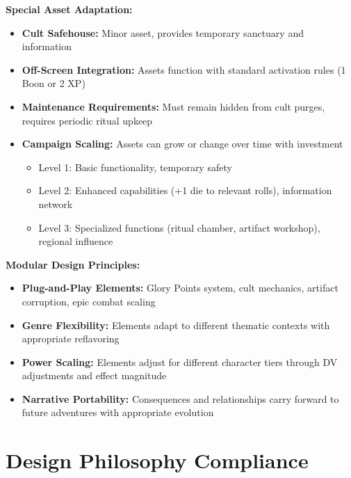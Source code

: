 \documentclass[11pt]{article}
\begin{document}
\begin{itemize}
\begin{itemize}
\begin{itemize}
\textbf{Special Asset Adaptation:}
\begin{itemize}
\item \textbf{Cult Safehouse:} Minor asset, provides temporary sanctuary and information
\item \textbf{Off-Screen Integration:} Assets function with standard activation rules (1 Boon or 2 XP)
\item \textbf{Maintenance Requirements:} Must remain hidden from cult purges, requires periodic ritual upkeep
\item \textbf{Campaign Scaling:} Assets can grow or change over time with investment
  \begin{itemize}
  \item Level 1: Basic functionality, temporary safety
  \item Level 2: Enhanced capabilities (+1 die to relevant rolls), information network
  \item Level 3: Specialized functions (ritual chamber, artifact workshop), regional influence
  \end{itemize}
\end{itemize}

\textbf{Modular Design Principles:}
\begin{itemize}
\item \textbf{Plug-and-Play Elements:} Glory Points system, cult mechanics, artifact corruption, epic combat scaling
\item \textbf{Genre Flexibility:} Elements adapt to different thematic contexts with appropriate reflavoring
\item \textbf{Power Scaling:} Elements adjust for different character tiers through DV adjustments and effect magnitude
\item \textbf{Narrative Portability:} Consequences and relationships carry forward to future adventures with appropriate evolution
\end{itemize}

\section{Design Philosophy Compliance}


\end{itemize}
\end{itemize}
\end{itemize}
\end{document}

